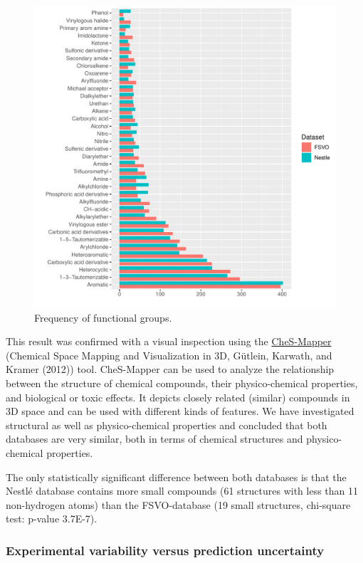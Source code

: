 \documentclass[]{achemso}
\begin{document}
\begin{figure}
\centering
\includegraphics{figures/functional-groups.pdf}
\caption{Frequency of functional groups.}\label{fig:fg}
\end{figure}

This result was confirmed with a visual inspection using the
\href{http://ches-mapper.org}{CheS-Mapper} (Chemical Space Mapping and
Visualization in 3D, Gütlein, Karwath, and Kramer (2012)) tool.
CheS-Mapper can be used to analyze the relationship between the
structure of chemical compounds, their physico-chemical properties, and
biological or toxic effects. It depicts closely related (similar)
compounds in 3D space and can be used with different kinds of features.
We have investigated structural as well as physico-chemical properties
and concluded that both databases are very similar, both in terms of
chemical structures and physico-chemical properties.

The only statistically significant difference between both databases is
that the Nestlé database contains more small compounds (61 structures
with less than 11 non-hydrogen atoms) than the FSVO-database (19 small
structures, chi-square test: p-value 3.7E-7).

\subsubsection{Experimental variability versus prediction
uncertainty}\label{experimental-variability-versus-prediction-uncertainty}
\end{document}
